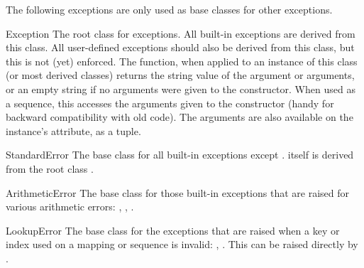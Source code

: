 
The following exceptions are only used as base classes for other
exceptions.

\begin{excdesc}{Exception}
The root class for exceptions.  All built-in exceptions are derived
from this class.  All user-defined exceptions should also be derived
from this class, but this is not (yet) enforced.  The 
function, when applied to an instance of this class (or most derived
classes) returns the string value of the argument or arguments, or an
empty string if no arguments were given to the constructor.  When used
as a sequence, this accesses the arguments given to the constructor
(handy for backward compatibility with old code).  The arguments are
also available on the instance's  attribute, as a tuple.
\end{excdesc}

\begin{excdesc}{StandardError}
The base class for all built-in exceptions except
.   itself is derived
from the root class
.
\end{excdesc}

\begin{excdesc}{ArithmeticError}
The base class for those built-in exceptions that are raised for
various arithmetic errors: ,
, .
\end{excdesc}

\begin{excdesc}{LookupError}
The base class for the exceptions that are raised when a key or
index used on a mapping or sequence is invalid: ,
.  This can be raised directly by
.
\end{excdesc}


